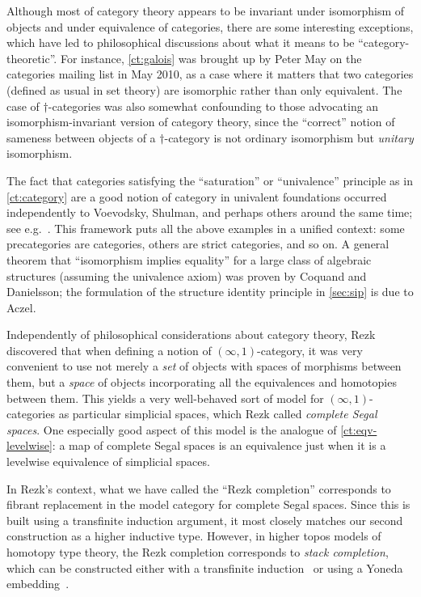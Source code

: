 Although most of category theory appears to be invariant under isomorphism of objects and under equivalence of categories, there are some interesting exceptions, which have led to philosophical discussions about what it means to be ``category-theoretic''.
For instance, \autoref{ct:galois} was brought up by Peter May on the categories mailing list in May 2010, as a case where it matters that two categories (defined as usual in set theory) are isomorphic rather than only equivalent.
The case of $\dagger$-categories was also somewhat confounding to those advocating an isomorphism-invariant version of category theory, since the ``correct'' notion of sameness between objects of a $\dagger$-category is not ordinary isomorphism but \emph{unitary} isomorphism.

The fact that categories satisfying the ``saturation'' or ``univalence'' principle as in \autoref{ct:category} are a good notion of category in univalent foundations occurred independently to Voevodsky, Shulman, and perhaps others around the same time; see e.g.~\cite{aks:rezk}.
This framework puts all the above examples in a unified context: some precategories are categories, others are strict categories, and so on.
A general theorem that ``isomorphism implies equality'' for a large class of algebraic structures (assuming the univalence axiom) was proven by Coquand and Danielsson; the formulation of the structure identity principle in \autoref{sec:sip} is due to Aczel.

Independently of philosophical considerations about category theory, Rezk~\cite{rezk01css} discovered that when defining a notion of $(\infty,1)$-category, it was very convenient to use not merely a \emph{set} of objects with spaces of morphisms between them, but a \emph{space} of objects incorporating all the equivalences and homotopies between them.
This yields a very well-behaved sort of model for $(\infty,1)$-categories as particular simplicial spaces, which Rezk called \emph{complete Segal spaces}.
One especially good aspect of this model is the analogue of \autoref{ct:eqv-levelwise}: a map of complete Segal spaces is an equivalence just when it is a levelwise equivalence of simplicial spaces.

In Rezk's context, what we have called the ``Rezk completion'' corresponds to fibrant replacement in the model category for complete Segal spaces.
Since this is built using a transfinite induction argument, it most closely matches our second construction as a higher inductive type.
However, in higher topos models of homotopy type theory, the Rezk completion corresponds to \emph{stack completion}, which can be constructed either with a transfinite induction~\cite{jt:strong-stacks} or using a Yoneda embedding~\cite{bunge:stacks-morita-internal}.

